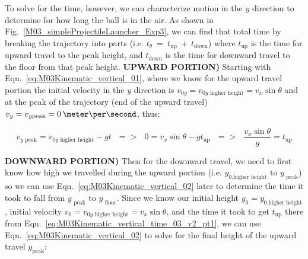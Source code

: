To solve for the time, however, we can characterize motion in the $y$ direction to determine for how long the ball is in the air.
%
%
%
%
%
%
%
As shown in Fig.~\ref{M03_simpleProjectileLauncher_Exp3}, we can find that total time by breaking the trajectory into parts (i.e. $t_{\theta}~=~t_{\text{up}}~+~t_{\text{down}}$) where $t_{\text{up}}$ is the time for upward travel to the peak height, and $t_{\text{down}}$ is the time for downward travel to the floor from that peak height. \textbf{UPWARD PORTION)} Starting with Eqn.~\ref{eq:M03Kinematic_vertical_01}, where we know for the upward travel portion the initial velocity in the $y$ direction is $v_{0y} = v_{0y\text{ higher height}} = v_{x}\sin{\theta}$ and at the peak of the trajectory (end of the upward travel) $v_{y} = v_{y\text{peak}} = 0\,\meter\per\second$, thus:

 \begin{equation}
  \label{eq:M03Kinematic_vertical_time_03_v2_pt1}
  v_{y\text{ peak}} = v_{0y\text{ higher height}} - gt~~~=>~~~0 = v_{x}\sin{\theta} - gt_{\text{up}}~~~=>~~~\frac{v_{x}\sin{\theta}}{g} = t_{\text{up}}
\end{equation}

\textbf{DOWNWARD PORTION)} Then for the downward travel, we need to first know how high we travelled during the upward portion (i.e. $y_{0\text{,higher height}} \text{ to } y_{\text{ peak}}$) so we can use Eqn.~\ref{eq:M03Kinematic_vertical_02} later to determine the time it took to fall from $y_{\text{ peak}} \text{ to } y_{\text{ floor}}$. Since we know our initial height $y_{0} = y_{0\text{,higher height}}$, initial velocity $v_{0} = v_{0y\text{ higher height}} = v_{x}\sin{\theta}$, and the time it took to get $t_{\text{up}}$ there from Eqn.~\ref{eq:M03Kinematic_vertical_time_03_v2_pt1}, we can use Eqn.~\ref{eq:M03Kinematic_vertical_02} to solve for the final height of the upward travel $y_{\text{peak}}$:

